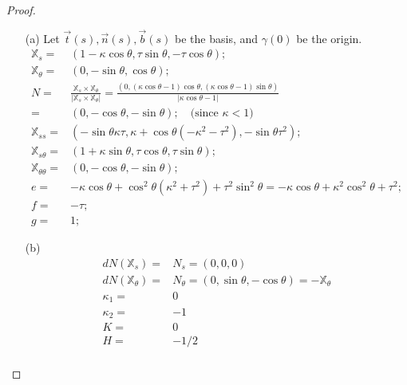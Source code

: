 \documentclass[10pt,a4paper]{article}
\begin{document}
\begin{proof}
\begin{enumerate}
\item[(a)] 
Let $\vec{t}(s), \vec{n}(s), \vec{b}(s)$ be the basis, and $\gamma(0)$ be the origin.
\begin{align*}
\mathbb{X}_{s} =& (1 - \kappa\cos\theta, \tau\sin\theta, -\tau\cos\theta); \\
\mathbb{X}_{\theta} =& (0, -\sin\theta, \cos\theta); \\
N =& \frac{\mathbb{X}_{s} \times \mathbb{X}_{\theta}}{|\mathbb{X}_{s} \times \mathbb{X}_{\theta}|} = \frac{(0, (\kappa\cos\theta - 1)\cos\theta, (\kappa\cos\theta - 1)\sin\theta)}{|\kappa\cos\theta - 1|} \\
  =& (0, -\cos\theta, -\sin\theta); \quad\text{(since $\kappa< 1$)} \\
\mathbb{X}_{ss} =& (-\sin\theta\kappa\tau, \kappa + \cos\theta(-\kappa^2 - \tau^2), -\sin\theta\tau^2); \\
\mathbb{X}_{s\theta} =& (1 + \kappa\sin\theta, \tau\cos\theta, \tau\sin\theta); \\
\mathbb{X}_{\theta\theta} =& (0, -\cos\theta, -\sin\theta); \\
e =& -\kappa\cos\theta + \cos^2\theta(\kappa^2 + \tau^2) + \tau^2\sin^2\theta = -\kappa\cos\theta + \kappa^2\cos^2\theta + \tau^2; \\
f =& -\tau; \\
g =& 1; 
\end{align*}
\item[(b)] 
\begin{align*}
dN(\mathbb{X}_{s}) =& N_{s} = (0, 0, 0) \\
dN(\mathbb{X}_{\theta}) =& N_{\theta} = (0, \sin\theta, -\cos\theta) = -\mathbb{X}_{\theta} \\
\kappa_1 =& 0 \\
\kappa_2 =& -1 \\
K =& 0 \\
H =& -1/2 \\
\end{align*}
\end{enumerate}
\end{proof}
\end{document}

